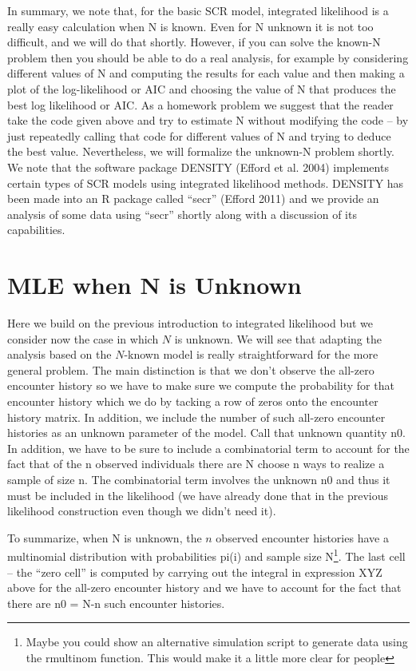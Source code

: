 In summary, we note that, for the basic SCR model, integrated
likelihood is a really easy calculation when N is known. Even for N
unknown it is not too difficult, and we will do that shortly.
However, if you can solve the known-N problem then you should be able
to do a real analysis, for example by considering different values of
N and computing the results for each value and then making a plot of
the log-likelihood or AIC and choosing the value of N that produces
the best log likelihood or AIC. As a homework problem we suggest that
the reader take the code given above and try to estimate N without
modifying the code – by just repeatedly calling that code for
different values of N and trying to deduce the best value.
Nevertheless, we will formalize the unknown-N problem shortly.  We
note that the software package DENSITY (Efford et al. 2004) implements
certain types of SCR models using integrated likelihood methods.
DENSITY has been made into an R package called “secr” (Efford 2011)
and we provide an analysis of some data using “secr” shortly along
with a discussion of its capabilities.


\section{MLE when N is Unknown} 

Here we build on the previous introduction to integrated likelihood
but we consider now the case in which $N$ is unknown. We will see that
adapting the analysis based on the $N$-known model is really
straightforward for the more general problem. The main distinction is
that we don’t observe the all-zero encounter history so we have to
make sure we compute the probability for that encounter history which
we do by tacking a row of zeros onto the encounter history matrix. In
addition, we include the number of such all-zero encounter histories
as an unknown parameter of the model. Call that unknown quantity n0.
In addition, we have to be sure to include a combinatorial term to
account for the fact that of the n observed individuals there are N
choose n ways to realize a sample of size n. The combinatorial term
involves the unknown n0 and thus it must be included in the likelihood
(we have already done that in the previous likelihood construction
even though we didn’t need it).

To summarize, when N is unknown, the $n$ observed encounter histories
have a multinomial distribution with probabilities pi(i) and sample
size N\footnote{ Maybe you could show an alternative simulation script
  to generate data using the rmultinom function. This would make it a
  little more clear for people}. The last cell – the “zero cell” is
computed by carrying out the integral in expression XYZ above for the
all-zero encounter history and we have to account for the fact that
there are n0 = N-n such encounter histories.

